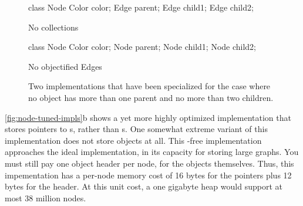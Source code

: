 \begin{figure}
\centering
\begin{subfloat}
\begin{minipage}[b]{0.38\textwidth}
\begin{shortlisting}
class Node {
   Color color;
   Edge parent;
   Edge child1;
   Edge child2;
}
\end{shortlisting}
\end{minipage}
\label{fig:node-no-collections}
\caption{No collections}
\end{subfloat}
\qquad
\begin{subfloat}
\begin{minipage}[b]{0.38\textwidth}
\begin{shortlisting}
class Node {
   Color color;
   Node parent;
   Node child1;
   Node child2;
}
\end{shortlisting} 
\end{minipage}
\caption{No objectified Edges}
\label{fig:node-no-Edge-objects}
\end{subfloat}
\caption{Two implementations that have been specialized for the case where
no object has more than one parent and no more than two children.}
\label{fig:node-tuned-impls}
\end{figure} 

\autoref{fig:node-tuned-impls}b shows a yet more highly optimized 
implementation that stores pointers to s, rather than s.
One somewhat extreme variant of this implementation does not store 
objects at all. This -free implementation approaches the ideal
implementation, in its capacity for storing large graphs. You must still pay one
object header per node, for the  objects themselves. Thus, this
impementation has a per-node memory cost of 16 bytes for the pointers plus 12
bytes for the header. At this unit cost, a one gigabyte heap would support at
most 38 million nodes.

